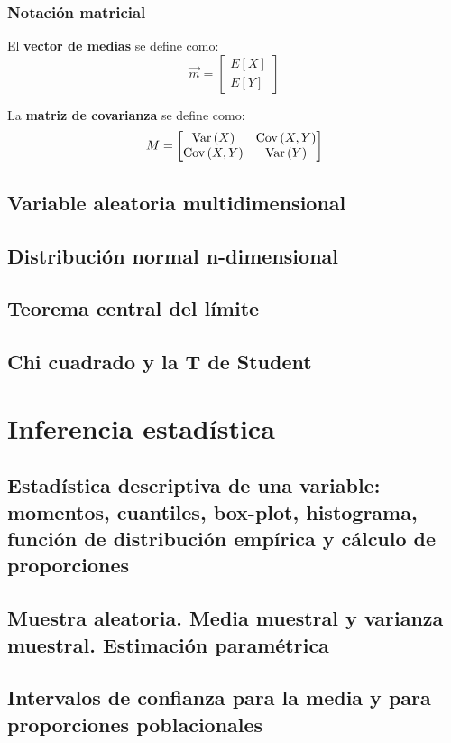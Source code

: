 \documentclass[a4paper]{book}
\begin{document}
\subsection{Notación matricial}
El \textbf{vector de medias} se define como:
\[ \vec{m} = \left[ 
\begin{matrix}
	E \left[ X \right]\\ 
	E \left[ Y \right]
\end{matrix} \right] \]

La \textbf{matriz de covarianza} se define como:
\[M=\left[ 
\begin{matrix}
	\operatorname{Var} \left( X \right)& \operatorname{Cov} \left( X,Y \right)\\ 
	\operatorname{Cov} \left( X,Y \right)& \operatorname{Var} \left( Y \right)
\end{matrix} \right]\]

\section{Variable aleatoria multidimensional}
\section{Distribución normal n-dimensional}
\section{Teorema central del límite}
\section{Chi cuadrado y la T de Student}


\chapter{Inferencia estadística}

\section{Estadística descriptiva de una variable: momentos, cuantiles, box-plot, histograma, función de distribución empírica y cálculo de proporciones}
\section{Muestra aleatoria. Media muestral y varianza muestral. Estimación paramétrica}

\section{Intervalos de confianza para la media y para proporciones poblacionales}
\end{document}
